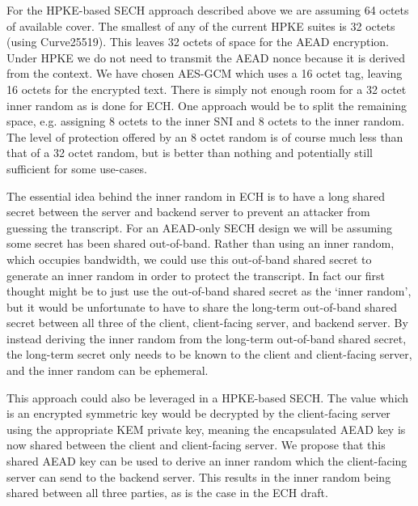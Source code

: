 For the \ac{HPKE}-based \ac{SECH} approach described above we are assuming
64 octets of available cover. The smallest  of any of the current
\ac{HPKE} suites is 32 octets (using Curve25519).
This leaves 32 octets of space for the \ac{AEAD}
encryption.
Under \ac{HPKE} we do not need to
transmit the \ac{AEAD} nonce because
it is derived from the context.
We have chosen \ac{AES-GCM} which uses a 16 octet tag, leaving 16 octets for the encrypted text.
There is simply not enough room for a 32 octet inner random as is done
for \ac{ECH}.
One approach would be to split the remaining space,
e.g. assigning 8 octets to the inner \ac{SNI} and 8 octets to the inner random.
The level of protection
offered by an 8 octet random is of course much less than that of a 32 octet random,
but is better than nothing and potentially still sufficient for some use-cases.

The essential idea behind the inner random in \ac{ECH} is to have a long
shared secret between the server and backend server to prevent an attacker
from guessing the transcript.
For an \ac{AEAD}-only \ac{SECH} design we will be assuming some secret has
been shared out-of-band.
Rather than using an inner random, which occupies bandwidth,
we could use this out-of-band shared secret to generate an inner random
in order to protect the transcript.
In fact our first thought might be to just
use the out-of-band shared secret as the `inner random',
but it would be unfortunate to have to share the long-term out-of-band shared secret between
all three of the client, client-facing server, and backend server.
By instead deriving the inner random from the long-term out-of-band shared secret, the
long-term secret only needs to be known to the client and client-facing server, and 
the inner random can be ephemeral.

This approach could also be leveraged in a \ac{HPKE}-based \ac{SECH}.
The  value which is an encrypted symmetric key would be decrypted
by the client-facing server using the appropriate \ac{KEM} private key, meaning the encapsulated \ac{AEAD} key is
now shared between the client and client-facing server.
We propose that this shared \ac{AEAD} key can be used to derive an inner random
which the client-facing server can send to the backend server.
This results in the inner random being shared between all three parties, as is
the case in the \ac{ECH} draft.


